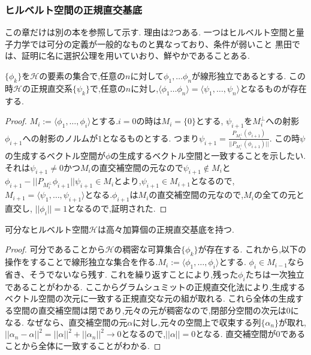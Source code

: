 \documentclass[uplatex]{jsbook}
\begin{document}
\subsubsection{ヒルベルト空間の正規直交基底}
この章だけは別の本を参照して示す.
理由は2つある.
一つはヒルベルト空間と量子力学では可分の定義が一般的なものと異なっており、条件が弱いこと
\cite{K} 黒田では、証明に名に選択公理を用いていおり、鮮やかであることある.

\begin{thm}[グラムシュミットの正規直交化法]
 $\{\phi_k\}$を$\mathcal{H}$の要素の集合で,任意の$n$に対して$\phi_1, \ldots \phi_n$が線形独立であるとする.
 この時$\mathcal{H}$の正規直交系$\{\psi_k\}$で,任意の$n$に対し,$\langle \phi_1 \ldots \phi_n \rangle = \langle \psi_1, \ldots, \psi_n\rangle$となるものが存在する.
\end{thm}
\begin{proof}
$M_i := \langle \phi_1, \ldots, \phi_i\rangle$とする.$i =0$の時は$M_i = \{0\}$とする,
$\psi_{i+1}$を$M_{i}^{\perp}$への射影$\phi_{i+1}$への射影のノルムが$1$となるものとする.
つまり$\psi_{i+1}=\frac{P_{M_i^{\perp}}(\phi_{i+1})}{||P_{M_i^{\perp}}(\phi_{i+1})||}$.
この時$\psi$の生成するベクトル空間が$\phi$の生成するベクトル空間と一致することを示したい.
それは$\psi_{i+1} \neq 0$かつ$M_i$の直交補空間の元なので$\psi_{i+1} \notin M_{i}$と
$\phi_{i+1} - ||P_{M_i ^{\perp}}\phi_{i+1}||\psi_{i+1} \in M_{i}$とより,$\psi_{i+1} \in M_{i+1}$となるので,
$M_{i+1}= \langle\psi_1, \ldots, \psi_{i+1}\rangle$となる.$\phi_{i+1}$は$M_i$の直交補空間の元なので,$M_i$の全ての元と直交し,
$||\phi_i|| =1$となるので,証明された.
\end{proof}

\begin{thm}
 可分なヒルベルト空間$\mathcal{H}$は高々加算個の正規直交基底を持つ.
\end{thm}
\begin{proof}
可分であることから$\mathcal{H}$の稠密な可算集合$\{\phi_k\}$が存在する.
これから,以下の操作をすることで線形独立な集合を作る.$M_{i}:= \langle\phi_1, \ldots, \phi_i\rangle$とする.
$\phi_i \in M_{i-1}$なら省き、そうでないなら残す.
これを繰り返すことにより,残った$\phi_i$たちは一次独立であることがわかる.
ここからグラムシュミットの正規直交化法により,生成するベクトル空間の次元に一致する正規直交な元の組が取れる.
これら全体の生成する空間の直交補空間は閉であり,元々の元が稠密なので,閉部分空間の次元は0になる.
なぜなら、直交補空間の元$\alpha$に対し,元々の空間上で収束する列$\{\alpha_n\}$が取れ,
$||\alpha_n - \alpha||^2 = ||\alpha||^2 + ||\alpha_n||^2 \to 0$となるので,$||\alpha|| = 0$となる.
直交補空間が0であることから全体に一致することがわかる.
\end{proof}
\end{document}

